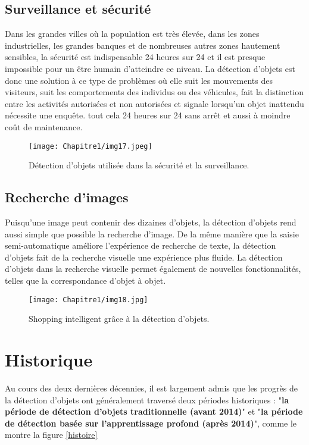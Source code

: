      
     \subsection{Surveillance et sécurité}
     Dans les grandes villes où la population est très élevée, dans les zones industrielles, les grandes banques et de nombreuses autres zones hautement sensibles, la sécurité est indispensable 24 heures sur 24 et il est presque impossible pour un être humain d'atteindre ce niveau. La détection d'objets est donc une solution à ce type de problèmes où elle suit les mouvements des visiteurs, suit les comportements des individus ou des véhicules, fait la distinction entre les activités autorisées et non autorisées et signale lorsqu'un objet inattendu nécessite une enquête. tout cela 24 heures sur 24 sans arrêt et aussi à moindre coût de maintenance.
     \begin{figure}[H]
          \centering
          \texttt{[image: Chapitre1/img17.jpeg]}
          \caption{Détection d'objets utilisée dans la sécurité et la surveillance.}
          \label{im17}
          \end{figure}

     \subsection{Recherche d'images}   
     Puisqu'une image peut contenir des dizaines d'objets, la détection d'objets rend aussi simple que possible la recherche d'image. De la même manière que la saisie semi-automatique améliore l'expérience de recherche de texte, la détection d'objets fait de la recherche visuelle une expérience plus fluide. La détection d'objets dans la recherche visuelle permet également de nouvelles fonctionnalités, telles que la correspondance d'objet à objet.
     \begin{figure}[H]
          \centering
          \texttt{[image: Chapitre1/img18.jpg]}
          \caption{Shopping intelligent grâce à la détection d'objets.}
          \label{im18}
          \end{figure}

\section{Historique}
Au cours des deux dernières décennies, il est largement admis que les progrès de la détection d'objets ont généralement traversé deux périodes historiques : "\textbf{la période de détection d'objets traditionnelle (avant 2014)}" et "\textbf{la période de détection basée sur l'apprentissage profond (après 2014)}", comme le montre la figure \ref{histoire}

